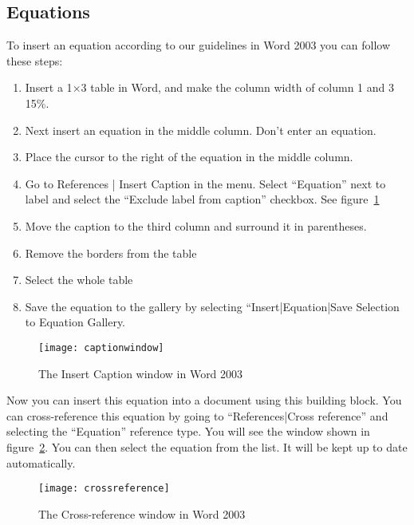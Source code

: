 \documentclass[a4paper,12pt]{article}
\begin{document}
\subsection{Equations}
\label{sec:tips-equations}
To insert an equation according to our guidelines in Word 2003 you can
follow these steps:
\begin{enumerate}
\item Insert a 1$\times$3 table in Word, and make the column width of
  column 1 and 3 15\%.
\item Next insert an equation in the middle column. Don't enter an
  equation.
\item Place the cursor to the right of the equation in the middle
  column.
\item Go to References | Insert Caption in the menu. Select
  ``Equation'' next to label and select the ``Exclude label from
  caption'' checkbox. See figure~\ref{fig:wordcaption}
\item Move the caption to the third column and surround it in
  parentheses.
\item Remove the borders from the table
\item Select the whole table
\item Save the equation to the gallery by selecting
  ``Insert|Equation|Save Selection to Equation Gallery.
\end{enumerate}
\begin{figure}[htbp]
  \centering
  \texttt{[image: captionwindow]}
  \caption{The Insert Caption window in Word 2003}
  \label{fig:wordcaption}
\end{figure}
Now you can insert this equation into a document using this building
block.  You can cross-reference this equation by going to
``References|Cross reference'' and selecting the ``Equation''
reference type.  You will see the window shown in
figure~\ref{fig:wordcrossref}.  You can then select the equation from
the list.  It will be kept up to date automatically.
\begin{figure}[htbp]
  \centering
  \texttt{[image: crossreference]}
  \caption{The Cross-reference window in Word 2003}
  \label{fig:wordcrossref}
\end{figure}
\end{document}
